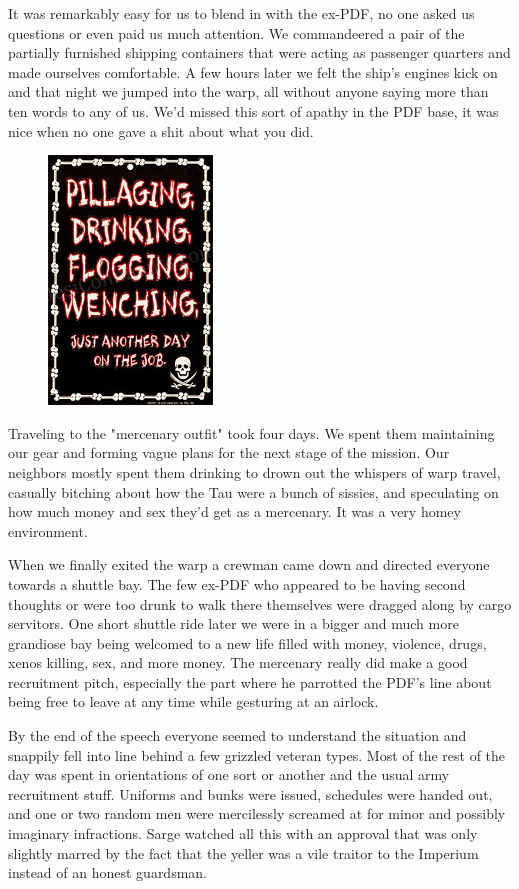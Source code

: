It was remarkably easy for us to blend in with the ex-PDF, no one asked us questions or even paid us much attention. 
We commandeered a pair of the partially furnished shipping containers that were acting as passenger quarters and made ourselves comfortable. 
A few hours later we felt the ship's engines kick on and that night we jumped into the warp, all without anyone saying more than ten words to any of us. 
We'd missed this sort of apathy in the PDF base, it was nice when no one gave a shit about what you did.

\begin{figure}
	\begin{center}
		\includegraphics[width=\figwidth]{pics/10/57.png}
	\end{center}
\end{figure}
Traveling to the "mercenary outfit" took four days. 
We spent them maintaining our gear and forming vague plans for the next stage of the mission. 
Our neighbors mostly spent them drinking to drown out the whispers of warp travel, casually bitching about how the Tau were a bunch of sissies, and speculating on how much money and sex they'd get as a mercenary. 
It was a very homey environment.

When we finally exited the warp a crewman came down and directed everyone towards a shuttle bay. 
The few ex-PDF who appeared to be having second thoughts or were too drunk to walk there themselves were dragged along by cargo servitors. 
One short shuttle ride later we were in a bigger and much more grandiose bay being welcomed to a new life filled with money, violence, drugs, xenos killing, sex, and more money. 
The mercenary really did make a good recruitment pitch, especially the part where he parrotted the PDF's line about being free to leave at any time while gesturing at an airlock. 


By the end of the speech everyone seemed to understand the situation and snappily fell into line behind a few grizzled veteran types. 
Most of the rest of the day was spent in orientations of one sort or another and the usual army recruitment stuff. 
Uniforms and bunks were issued, schedules were handed out, and one or two random men were mercilessly screamed at for minor and possibly imaginary infractions. 
Sarge watched all this with an approval that was only slightly marred by the fact that the yeller was a vile traitor to the Imperium instead of an honest guardsman.

